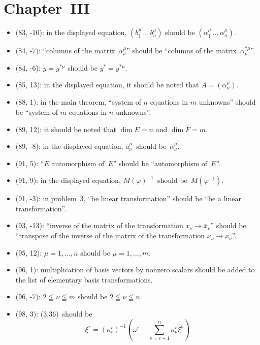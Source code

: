 \documentclass[letterpaper,12pt]{article}
\begin{document}
\section*{Chapter~III}
\begin{itemize}
\item (83, -10): in the displayed equation, \((b^{\mu}_1\,\ldots\,b^{\mu}_n)\) should be \((\alpha^{\mu}_1\,\ldots\,\alpha^{\mu}_n)\).
\item (84, -7): ``columns of the matrix~\(\alpha^{\mu}_{\nu}\)'' should be ``columns of the matrix~\(\alpha^{*\mu}_{\nu}\)''.
\item (84, -6): \(y=y^{*\mu}\) should be \(y^*=y^{*\mu}\).
\item (85, 13): in the displayed equation, it should be noted that \(A=(\alpha^{\mu}_{\nu})\).
\item (88, 1): in the main theorem, ``system of \(n\) equations in \(m\) unknowns'' should be ``system of \(m\) equations in \(n\) unknowns''.
\item (89, 12): it should be noted that \(\dim E=n\) and \(\dim F=m\).
\item (89, -8): in the displayed equation, \(a^{\mu}_{\nu}\)~should be~\(\alpha^{\mu}_{\nu}\).
\item (91, 5): ``\(E\) automorphism of~\(E\)'' should be ``automorphism of~\(E\)''.
\item (91, 9): in the displayed equation, \(M(\varphi)^{-1}\)~should be~\(M(\varphi^{-1})\).
\item (91, -3): in problem~3, ``be linear transformation'' should be ``be a linear transformation''.
\item (93, -13): ``inverse of the matrix of the transformation \(x_{\nu}\to\bar{x}_{\nu}\)'' should be ``transpose of the inverse of the matrix of the transformation \(x_{\nu}\to\bar{x}_{\nu}\)''.
\item (95, 12): \(\mu=1,\ldots,n\) should be \(\mu=1,\ldots,m\).
\item (96, 1): multiplication of basis vectors by nonzero scalars should be added to the list of elementary basis transformations.
\item (96, -7): \(2\leqq\nu\leqq m\) should be \(2\leqq\nu\leqq n\).
\item (98, 3): (3.36)~should be
\[\xi^r=(\kappa^r_r)^{-1}\left(\omega^r-\sum_{\nu=r+1}^n\kappa^r_{\nu}\xi^{\nu}\right)\]
\end{itemize}
\end{document}
